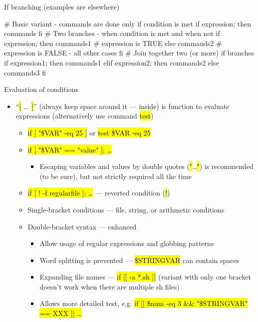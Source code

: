 \documentclass[compress, ucs, xelatex, 11pt, xcolor=svgnames,
  hyperref={
    bookmarks=true,
    unicode=true,
    colorlinks=true,
    pdftitle={Linux, command line and MetaCentrum},
    plainpages=false,
    pdfauthor={Vojtech Zeisek},
    pdfsubject={Course about use of Linux command line, writing shell scripts and using MetaCentrum of CESNET},
    pdfcreator={XeLaTeX},
    pdfkeywords={Linux, GNU, BASH, shell, command line, MetaCentrum},
    linkcolor=DarkRed,
    anchorcolor=DarkBlue,
    citecolor=Indigo,
    filecolor=NavyBlue,
    menucolor=DarkMagenta,
    urlcolor=DarkBlue,
    pdftex},
  url={hyphens, lowtilde} %
  ]{beamer}
\renewcommand{\texttt}[1]{\hl{\ttfamily #1}}
\begin{document}
\begin{frame}[fragile]{If branching (examples are elsewhere)}
  \begin{bashcode}
    # Basic variant - commands are done only if condition is met
    if expression; then
        commands
      fi
    # Two branches - when condition is met and when not
    if expression; then
        commands1 # expression is TRUE
      else
        commands2 # expression is FALSE - all other cases
      fi
    # Join together two (or more) if branches
    if expression1; then
        commands1
      elif expression2; then
          commands2
        else
          commands3
        fi
  \end{bashcode}
\end{frame}

\begin{frame}[allowframebreaks]{Evaluation of conditions}
  \begin{itemize}
    \item ``\texttt{[} \ldots~\texttt{]}'' (always keep space around it --- inside) is function to evaluate expressions (alternatively use command \texttt{test})
    \begin{itemize}
      \item \texttt{if [ "\$VAR" -eq 25 ]} or \texttt{test \$VAR -eq 25}
      \item \texttt{if [ "\$VAR" == "value" ]; \ldots}
      \begin{itemize}
	\item Escaping variables and values by double quotes (\texttt{"}\ldots\texttt{"}) is recommended (to be sure), but not strictly required all the time
      \end{itemize}
      \item \texttt{if [ ! -f regularfile ]; \ldots} --- reverted condition (\texttt{!})
      \item Single-bracket conditions --- file, string, or arithmetic conditions
      \item Double-bracket syntax --- enhanced
      \begin{itemize}
	\item Allow usage of regular expressions and globbing patterns
	\item Word splitting is prevented --- \texttt{\$STRINGVAR} can contain spaces
	\item Expanding file names --- \texttt{if [[ -a *.sh ]]} (variant with only one bracket doesn't work when there are multiple sh files)
	\item Allows more detailed test, e.g. \texttt{if [[ \$num -eq 3 \&\& "\$STRINGVAR" == XXX ]] \ldots}

\end{itemize}
\end{itemize}
\end{itemize}
\end{frame}
\end{document}
